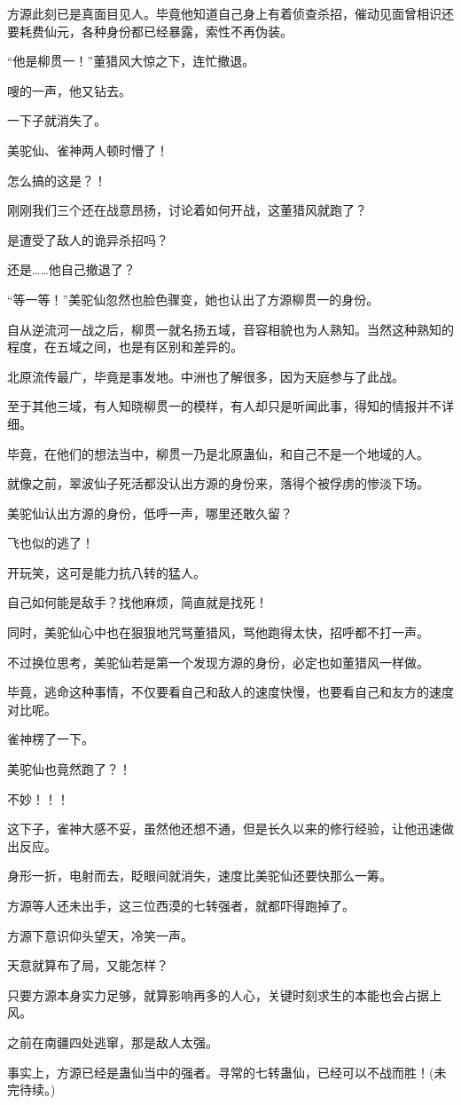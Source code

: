 \begin{this_body}
方源此刻已是真面目见人。毕竟他知道自己身上有着侦查杀招，催动见面曾相识还要耗费仙元，各种身份都已经暴露，索性不再伪装。

“他是柳贯一！”董猎风大惊之下，连忙撤退。

嗖的一声，他又钻去。

一下子就消失了。

美驼仙、雀神两人顿时懵了！

怎么搞的这是？！

刚刚我们三个还在战意昂扬，讨论着如何开战，这董猎风就跑了？

是遭受了敌人的诡异杀招吗？

还是……他自己撤退了？

“等一等！”美驼仙忽然也脸色骤变，她也认出了方源柳贯一的身份。

自从逆流河一战之后，柳贯一就名扬五域，音容相貌也为人熟知。当然这种熟知的程度，在五域之间，也是有区别和差异的。

北原流传最广，毕竟是事发地。中洲也了解很多，因为天庭参与了此战。

至于其他三域，有人知晓柳贯一的模样，有人却只是听闻此事，得知的情报并不详细。

毕竟，在他们的想法当中，柳贯一乃是北原蛊仙，和自己不是一个地域的人。

就像之前，翠波仙子死活都没认出方源的身份来，落得个被俘虏的惨淡下场。

美驼仙认出方源的身份，低呼一声，哪里还敢久留？

飞也似的逃了！

开玩笑，这可是能力抗八转的猛人。

自己如何能是敌手？找他麻烦，简直就是找死！

同时，美驼仙心中也在狠狠地咒骂董猎风，骂他跑得太快，招呼都不打一声。

不过换位思考，美驼仙若是第一个发现方源的身份，必定也如董猎风一样做。

毕竟，逃命这种事情，不仅要看自己和敌人的速度快慢，也要看自己和友方的速度对比呢。

雀神楞了一下。

美驼仙也竟然跑了？！

不妙！！！

这下子，雀神大感不妥，虽然他还想不通，但是长久以来的修行经验，让他迅速做出反应。

身形一折，电射而去，眨眼间就消失，速度比美驼仙还要快那么一筹。

方源等人还未出手，这三位西漠的七转强者，就都吓得跑掉了。

方源下意识仰头望天，冷笑一声。

天意就算布了局，又能怎样？

只要方源本身实力足够，就算影响再多的人心，关键时刻求生的本能也会占据上风。

之前在南疆四处逃窜，那是敌人太强。

事实上，方源已经是蛊仙当中的强者。寻常的七转蛊仙，已经可以不战而胜！(未完待续。)

\end{this_body}

